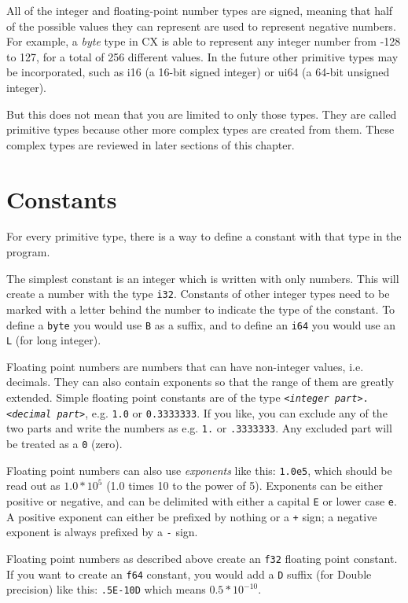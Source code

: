 \documentclass[11pt,fleqn,openany]{book} %
\begin{document}
All of the integer and floating-point number types are signed, meaning that half of the possible values they can represent are used to represent negative numbers. For example, a \textit{byte} type in CX is able to represent any integer number from -128 to 127, for a total of 256 different values. In the future other primitive types may be incorporated, such as i16 (a 16-bit signed integer) or ui64 (a 64-bit unsigned integer).

But this does not mean that you are limited to only those types. They are called primitive types because other more complex types are created from them. These complex types are reviewed in later sections of this chapter.

\section{Constants}

For every primitive type, there is a way to define a constant with that type in the program.

The simplest constant is an integer which is written with only numbers. This will create a number with the type \texttt{i32}. Constants of other integer types need to be marked with a letter behind the number to indicate the type of the constant. To define a \texttt{byte} you would use \texttt{B} as a suffix, and to define an \texttt{i64} you would use an \texttt{L} (for long integer).

Floating point numbers are numbers that can have non-integer values, i.e. decimals. They can also contain exponents so that the range of them are greatly extended. Simple floating point constants are of the type \texttt{\textit{<integer part>}.\textit{<decimal part>}}, e.g. \texttt{1.0} or \texttt{0.3333333}. If you like, you can exclude any of the two parts and write the numbers as e.g. \texttt{1.} or \texttt{.3333333}. Any excluded part will be treated as a \texttt{0} (zero).

Floating point numbers can also use \textit{exponents} like this: \texttt{1.0e5}, which should be read out as $1.0*10^5$ (1.0 times 10 to the power of 5).  Exponents can be either positive or negative, and can be delimited with either a capital \texttt{E} or lower case \texttt{e}. A positive exponent can either be prefixed by nothing or a \texttt{+} sign; a negative exponent is always prefixed by a \texttt{-} sign.

Floating point numbers as described above create an \texttt{f32} floating point constant.  If you want to create an \texttt{f64} constant, you would add a \texttt{D} suffix (for Double precision) like this: \texttt{.5E-10D} which means $0.5*10^{-10}$.
\end{document}
